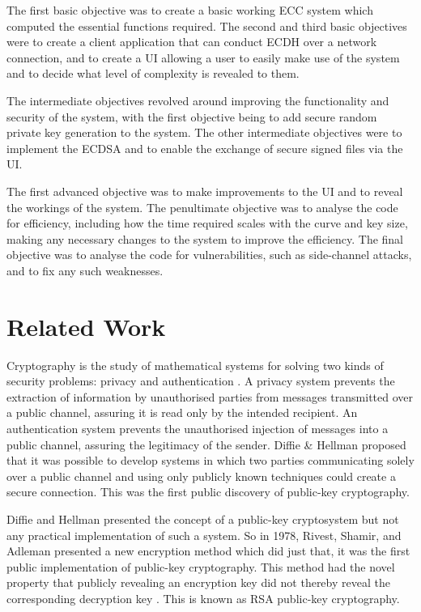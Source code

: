 \documentclass[12pt,a4paper]{article}
\begin{document}
The first basic objective was to create a basic working ECC system which computed the essential functions required. 
The second and third basic objectives were to create a client application that can conduct ECDH over a network connection, 
and to create a UI allowing a user to easily make use of the system and to decide what level of complexity is revealed to them. 

The intermediate objectives revolved around improving the functionality and security of the system, 
with the first objective being to add secure random private key generation to the system. 
The other intermediate objectives were to implement the ECDSA and to enable the exchange of secure signed files via the UI. 

The first advanced objective was to make improvements to the UI and to reveal the workings of the system. 
The penultimate objective was to analyse the code for efficiency, including how the time required scales with the curve and key size, 
making any necessary changes to the system to improve the efficiency. 
The final objective was to analyse the code for vulnerabilities, such as side-channel attacks, and to fix any such weaknesses. 


\section{Related Work} \noindent
Cryptography is the study of mathematical systems for solving two kinds of security problems: privacy and authentication \cite{1055638}. 
A privacy system prevents the extraction of information by unauthorised parties from messages transmitted over a public channel, assuring it is read only by the intended recipient. 
An authentication system prevents the unauthorised injection of messages into a public channel, assuring the legitimacy of the sender. 
Diffie \& Hellman \citeyear{1055638} proposed that it was possible to develop systems in which two parties communicating solely over a public channel and using only publicly known techniques could create a secure connection. 
This was the first public discovery of public-key cryptography.

Diffie and Hellman presented the concept of a public-key cryptosystem but not any practical implementation of such a system. 
So in 1978, Rivest, Shamir, and Adleman presented a new encryption method which did just that, it was the first public implementation of public-key cryptography. 
This method had the novel property that publicly revealing an encryption key did not thereby reveal the corresponding decryption key \cite{10.1145/359340.359342}. 
This is known as RSA public-key cryptography. 
\end{document}
